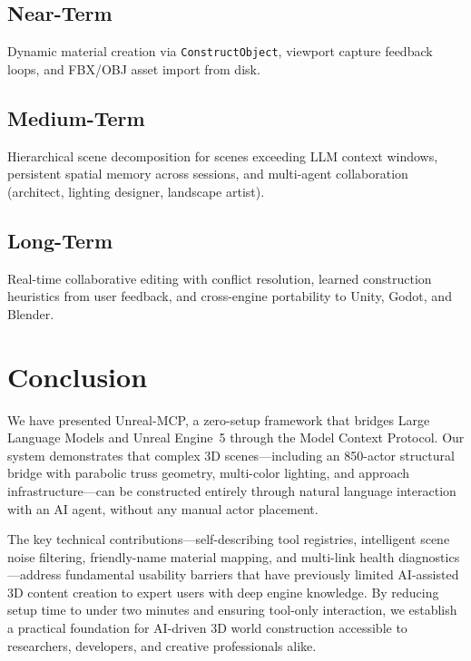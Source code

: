 \documentclass[conference]{IEEEtran}
\begin{document}
\subsection{Near-Term}
Dynamic material creation via \texttt{ConstructObject}, viewport capture feedback loops, and FBX/OBJ asset import from disk.

\subsection{Medium-Term}
Hierarchical scene decomposition for scenes exceeding LLM context windows, persistent spatial memory across sessions, and multi-agent collaboration (architect, lighting designer, landscape artist).

\subsection{Long-Term}
Real-time collaborative editing with conflict resolution, learned construction heuristics from user feedback, and cross-engine portability to Unity, Godot, and Blender.

\section{Conclusion}

We have presented Unreal-MCP, a zero-setup framework that bridges Large Language Models and Unreal Engine~5 through the Model Context Protocol. Our system demonstrates that complex 3D scenes---including an 850-actor structural bridge with parabolic truss geometry, multi-color lighting, and approach infrastructure---can be constructed entirely through natural language interaction with an AI agent, without any manual actor placement.

The key technical contributions---self-describing tool registries, intelligent scene noise filtering, friendly-name material mapping, and multi-link health diagnostics---address fundamental usability barriers that have previously limited AI-assisted 3D content creation to expert users with deep engine knowledge. By reducing setup time to under two minutes and ensuring tool-only interaction, we establish a practical foundation for AI-driven 3D world construction accessible to researchers, developers, and creative professionals alike.
\end{document}
